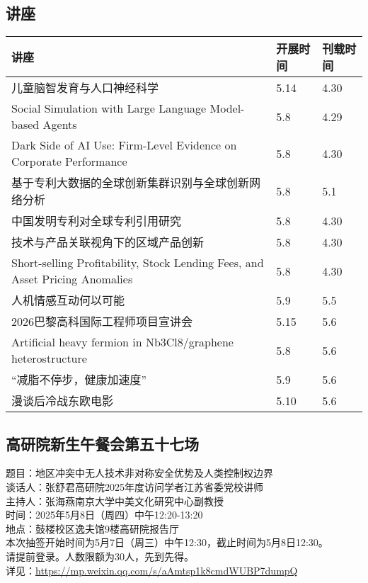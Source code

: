 \documentclass[letterpaper, 12pt]{article}
\begin{document}
\begin{multicols}{2}
\section{讲座}
\begin{tabular}{|>{\centering\arraybackslash}m{}|m{}|m{}|}
    \hline
    讲座 & 开展时间 & 刊载时间\\
    \hline\hline
    儿童脑智发育与人口神经科学 & 5.14 & 4.30\\\hline
    Social Simulation with Large Language Model-based Agents & 5.8 & 4.29\\\hline
    Dark Side of AI Use: Firm-Level Evidence on Corporate Performance & 5.8 & 4.30\\\hline
    基于专利大数据的全球创新集群识别与全球创新网络分析 & 5.8 & 5.1\\\hline
    中国发明专利对全球专利引用研究 & 5.8 & 4.30\\\hline
    技术与产品关联视角下的区域产品创新 & 5.8 & 4.30\\\hline
    Short-selling Profitability, Stock Lending Fees, and Asset Pricing Anomalies & 5.8 & 4.30\\\hline
    人机情感互动何以可能 & 5.9 & 5.5\\\hline
    2026巴黎高科国际工程师项目宣讲会 & 5.15 & 5.6\\\hline
    Artificial heavy fermion in Nb3Cl8/graphene heterostructure & 5.8 & 5.6\\\hline
    “减脂不停步，健康加速度” & 5.9 & 5.6\\\hline
    漫谈后冷战东欧电影 & 5.10 & 5.6\\\hline
\end{tabular}

\subsection{高研院新生午餐会第五十七场} %
题目：地区冲突中无人技术非对称安全优势及人类控制权边界
\\谈话人：张舒君高研院2025年度访问学者江苏省委党校讲师
\\主持人：张海燕南京大学中美文化研究中心副教授
\\时间：2025年5月8日（周四）中午12:20-13:20
\\地点：鼓楼校区逸夫馆9楼高研院报告厅
\\本次抽签开始时间为5月7日（周三）中午12:30，截止时间为5月8日12:30。
\\请提前登录。人数限额为30人，先到先得。
\\详见：\url{https://mp.weixin.qq.com/s/aAmtsp1k8cmdWUBP7dumpQ}


\end{multicols}
\end{document}
